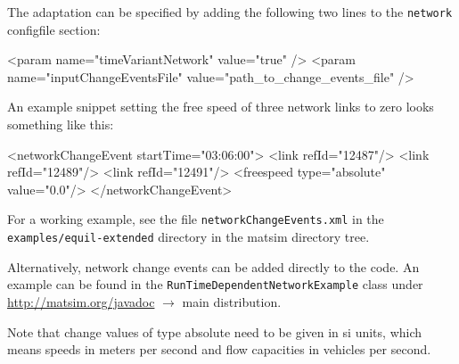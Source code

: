 The adaptation can be specified by adding the following two lines to the \lstinline|network| \gls{configfile} section:
\begin{xml}
<param name="timeVariantNetwork" value="true" />
<param name="inputChangeEventsFile" value="path_to_change_events_file" />
\end{xml}
%
An example snippet setting the free speed of three network links to zero looks something like this:
%
\begin{xml}
<networkChangeEvent startTime="03:06:00">
   <link refId="12487"/>
   <link refId="12489"/>
   <link refId="12491"/>
   <freespeed type="absolute" value="0.0"/>
</networkChangeEvent>
\end{xml}
%
For a working example, see the file \lstinline|networkChangeEvents.xml| in the \lstinline|examples/equil-extended| directory in the \gls{matsim} directory tree.

Alternatively, network change events can be added directly to the code.
An example can be found in the \lstinline{RunTimeDependentNetworkExample} class under \url{http://matsim.org/javadoc} $\to$ main distribution.

Note that change values of type absolute need to be given in \gls{si} units, which means speeds in meters per second and flow capacities in vehicles per second.


%
%

